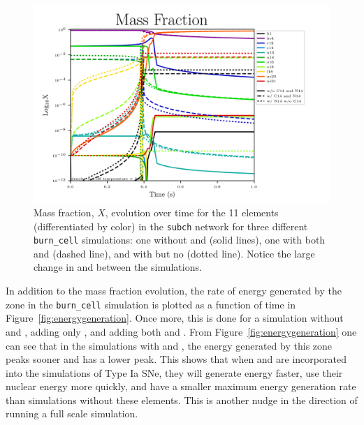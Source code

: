 \documentclass[preprint]{aastex62}
\begin{document}
      \begin{figure}
        \centering
        \includegraphics[width=6in]{images/subch_nC14nN14_xn_tol-10.png}
        \caption{Mass fraction, $X$, evolution over time for the 11 elements (differentiated by color) in the {\tt subch} network for three different {\tt burn\_cell} simulations: one without  and  (solid lines), one with both  and  (dashed line), and with  but no  (dotted line). Notice the large change in  and  between the simulations.
          }
        \label{fig:microphysicsX}
      \end{figure} 
      
      In addition to the mass fraction evolution, the rate of energy generated by the zone in the {\tt burn\_cell} simulation is plotted as a function of time in Figure~\ref{fig:energygeneration}. Once more, this is done for a simulation without  and , adding only , and adding both  and . From Figure~\ref{fig:energygeneration} one can see that in the simulations with  and , the energy generated by this zone peaks sooner and has a lower peak.  This shows that when  and  are incorporated into the simulations of Type Ia SNe, they will generate energy faster, use their nuclear energy more quickly, and have a smaller maximum energy generation rate than simulations without these elements. This is another nudge in the direction of running a full scale simulation. 
      
\end{document}
